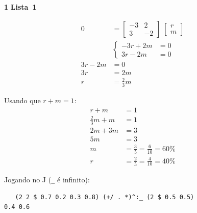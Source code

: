 \documentclass{article}
\newcounter{exe-list}
\newenvironment{exe-list}
    {\begin{list}{(\alph{exe-list})}{\usecounter{exe-list}}}
    {\end{list}}
\newenvironment{exe}[2][Sala]
    {\bigskip\noindent\par\ifthenelse{\equal{#1}{}}%
        {\textbf{\LARGE #2}}%
        {\textbf{\LARGE #1~#2}}%
    \medskip\noindent\par}
    {\bigskip}
\begin{document}
\begin{exe}[Lista]{1}
\begin{exe-list}
\begin{align*}
                0 &= \begin{bmatrix}
                        -3 & 2 \\
                        3 & -2
                    \end{bmatrix}
                    \; \begin{bmatrix}
                        r \\ m
                    \end{bmatrix} \\
                &\begin{cases}
                        -3 r + 2 m &= 0 \\
                        3 r - 2 m &= 0
                    \end{cases} \\
                3 r - 2 m &= 0 \\
                3 r &= 2 m \\
                r &= \frac23 m
            \end{align*}

            Usando que \(r + m = 1\):
            \begin{align*}
                r + m &= 1 \\
                \frac23 m + m &= 1 \\
                2 m + 3 m &= 3 \\
                5 m &= 3 \\
                m &= \frac35 = \frac{6}{10} = 60\% \\
                r &= \frac25 = \frac{4}{10} = 40\%
            \end{align*}

            Jogando no J (\verb._. é infinito):
            \begin{verbatim}
   (2 2 $ 0.7 0.2 0.3 0.8) (+/ . *)^:_ (2 $ 0.5 0.5)
0.4 0.6
            \end{verbatim}
    \end{exe-list}
\end{exe}
\end{document}
